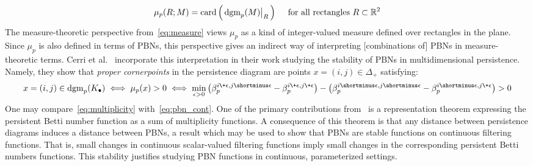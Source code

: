 \begin{equation}\label{eq:measure}
	\mu_p(R; M) = \mathrm{card}\left( \,
	\restr{\mathrm{dgm}_p(M)}{R} \,
	\right) \quad \text{ for all rectangles } R \subset \mathbb{R}^2 
\end{equation}
The measure-theoretic perspective from~\eqref{eq:measure} views $\mu_p$ as a kind of integer-valued measure defined over rectangles in the plane. Since $\mu_p$ is also defined in terms of PBNs, this perspective gives an indirect way of interpreting [combinations of] PBNs in measure-theoretic terms. Cerri et al.~\cite{cerri2013betti} incorporate this interpretation in their work studying the stability of PBNs in multidimensional persistence. 
Namely, they show that \emph{proper cornerpoints} in the persistence diagram are points $x = (i,j) \in \Delta_+$ satisfying:
\begin{equation}\label{eq:pbn_cont}
	x = (i,j) \in \mathrm{dgm}_p(K_\bullet) \; \Longleftrightarrow \; \mu_p(x) > 0 \; \Longleftrightarrow \; \min_{\epsilon > 0} \left(\beta_p^{i \+ \epsilon, j \shortminus \epsilon} - \beta_p^{i \+ \epsilon, j \+ \epsilon} \right) - \left(\beta_p^{i \shortminus \epsilon, j \shortminus \epsilon} - \beta_p^{i \shortminus \epsilon, j \+ \epsilon} \right) > 0
\end{equation}
One may compare~\eqref{eq:multiplicity} with~\eqref{eq:pbn_cont}. One of the primary contributions from~\cite{cerri2013betti} is a representation theorem expressing the persistent Betti number function as a sum of multiplicity functions. A consequence of this theorem is that any distance between persistence diagrams induces a distance between PBNs, a result which may be used to show that PBNs are stable functions on continuous filtering functions. 
That is, small changes in continuous scalar-valued filtering functions imply small changes in the corresponding persistent Betti numbers functions. 
This stability justifies studying PBN functions in continuous, parameterized settings. 

